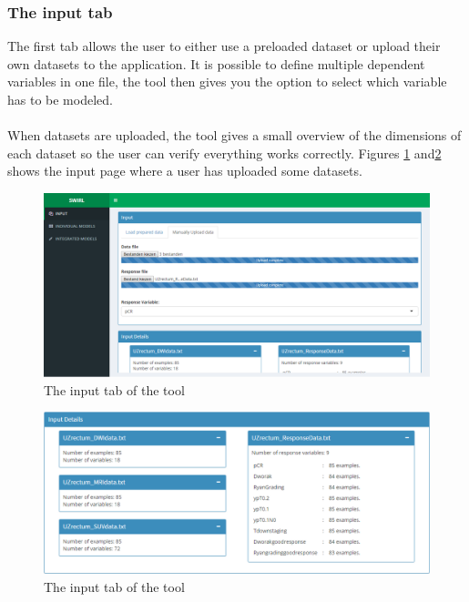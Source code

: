 \subsubsection{The input tab}
The first tab allows the user to either use a preloaded dataset or upload their own datasets to the application. It is possible to define multiple dependent variables in one file, the tool then gives you the option to select which variable has to be modeled. \\ \\
When datasets are uploaded, the tool gives a small overview of the dimensions of each dataset so the user can verify everything works correctly. Figures \ref{fig:tool-input} and\ref{fig:tool-input2} shows the input page where a user has uploaded some datasets.
\begin{figure}
	\centering
	\includegraphics[scale=.3]{images/tool_input_1}
	\caption{The input tab of the tool}
	\label{fig:tool-input}
\end{figure}
\begin{figure}
	\centering
	\includegraphics[scale=.4]{images/tool_input_overview}
	\caption{The input tab of the tool}
	\label{fig:tool-input2}
\end{figure}
